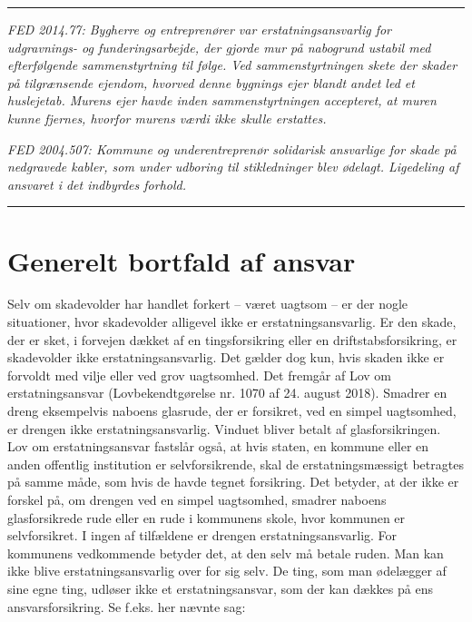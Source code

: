 \documentclass[]{book}
\begin{document}
\begin{center}\rule{0.5\linewidth}{\linethickness}\end{center}

\emph{FED 2014.77: Bygherre og entreprenører var erstatningsansvarlig for udgravnings- og funderingsarbejde, der gjorde mur på nabogrund ustabil med efterfølgende sammenstyrtning til følge. Ved sammenstyrtningen skete der skader på tilgrænsende ejendom, hvorved denne bygnings ejer blandt andet led et huslejetab. Murens ejer havde inden sammenstyrtningen accepteret, at muren kunne fjernes, hvorfor murens værdi ikke skulle erstattes.}

\emph{FED 2004.507: Kommune og underentreprenør solidarisk ansvarlige for skade på nedgravede kabler, som under udboring til stikledninger blev ødelagt. Ligedeling af ansvaret i det indbyrdes forhold.}

\begin{center}\rule{0.5\linewidth}{\linethickness}\end{center}

\hypertarget{generelt-bortfald-af-ansvar}{%
\section{Generelt bortfald af ansvar}\label{generelt-bortfald-af-ansvar}}

Selv om skadevolder har handlet forkert -- været uagtsom -- er der nogle situationer, hvor skadevolder alligevel ikke er erstatningsansvarlig.
Er den skade, der er sket, i forvejen dækket af en tingsforsikring eller en driftstabsforsikring, er skadevolder ikke erstatningsansvarlig. Det gælder dog kun, hvis skaden ikke er forvoldt med vilje eller ved grov uagtsomhed. Det fremgår af Lov om erstatningsansvar (Lovbekendtgørelse nr. 1070 af 24. august 2018). Smadrer en dreng eksempelvis naboens glasrude, der er forsikret, ved en simpel uagtsomhed, er drengen ikke erstatningsansvarlig. Vinduet bliver betalt af glasforsikringen.
Lov om erstatningsansvar fastslår også, at hvis staten, en kommune eller en anden offentlig institution er selvforsikrende, skal de erstatningsmæssigt betragtes på samme måde, som hvis de havde tegnet forsikring. Det betyder, at der ikke er forskel på, om drengen ved en simpel uagtsomhed, smadrer naboens glasforsikrede rude eller en rude i kommunens skole, hvor kommunen er selvforsikret. I ingen af tilfældene er drengen erstatningsansvarlig. For kommunens vedkommende betyder det, at den selv må betale ruden.
Man kan ikke blive erstatningsansvarlig over for sig selv. De ting, som man ødelægger af sine egne ting, udløser ikke et erstatningsansvar, som der kan dækkes på ens ansvarsforsikring. Se f.eks. her nævnte sag:
\end{document}
